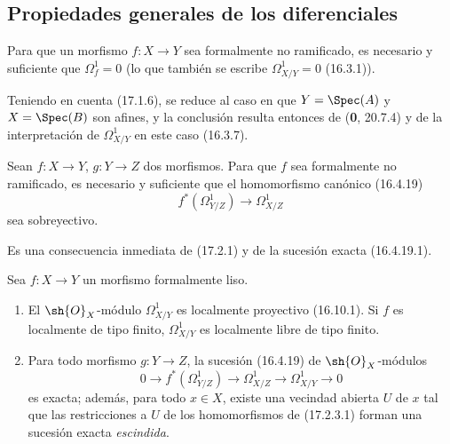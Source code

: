 \subsection{Propiedades generales de los diferenciales}
\label{subsection:IV.17.2}

\begin{proposition}[17.2.1]
\label{IV.17.2.1}
Para que un morfismo $f:X\to Y$ sea formalmente no ramificado, es necesario y suficiente que $\varOmega_f^1=0$ \textup{(lo que también se escribe $\varOmega_{X/Y}^1=0$ (16.3.1))}.
\end{proposition}

Teniendo en cuenta (17.1.6), se reduce al caso en que $Y=\Spec(A)$ y $X=\Spec(B)$ son afines, y la conclusión resulta entonces de (\textbf 0, 20.7.4) y de la interpretación de $\varOmega_{X/Y}^1$ en este caso (16.3.7).

\begin{corollary}[17.2.2]
\label{IV.17.2.2}
Sean $f:X\to Y$, $g:Y\to Z$ dos morfismos. Para que $f$ sea formalmente no ramificado, es necesario y suficiente que el homomorfismo canónico \textup{(16.4.19)}
\[
  f^*(\varOmega_{Y/Z}^1)\longrightarrow\varOmega_{X/Z}^1
\]
sea sobreyectivo.
\end{corollary}

Es una consecuencia inmediata de (17.2.1) y de la sucesión exacta (16.4.19.1).

\begin{proposition}[17.2.3]
\label{IV.17.2.3}
Sea $f:X\to Y$ un morfismo formalmente liso.
\begin{enumerate}
  \item[\textup{(i)}] El $\sh{O}_X$-módulo $\varOmega_{X/Y}^1$ es localmente proyectivo \textup{(16.10.1)}. Si $f$ es localmente de tipo finito, $\varOmega_{X/Y}^1$ es localmente libre de tipo finito.
  \item[\textup{(ii)}] Para todo morfismo $g:Y\to Z$, la sucesión \textup{(16.4.19)} de $\sh{O}_X$-módulos
  \[
  \label{IV.17.2.3.1}
    0\longrightarrow f^*(\varOmega_{Y/Z}^1)\longrightarrow\varOmega_{X/Z}^1\longrightarrow\varOmega_{X/Y}^1\longrightarrow0
    \tag{17.2.3.1}
  \]
  es exacta; además, para todo $x\in X$, existe una vecindad abierta $U$ de $x$ tal que las restricciones a $U$ de los homomorfismos de \textup{(17.2.3.1)} forman una sucesión exacta \emph{escindida}.
\end{enumerate}
\end{proposition}

